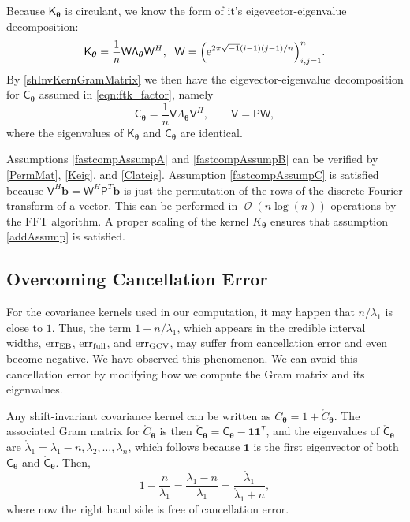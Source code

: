 \documentclass[twocolumn]{svjour3}          %
\DeclareMathOperator{\Order}{{\mathcal O}}
\newcommand{\bm}[1]{\boldsymbol{#1}}
\newcommand{\rC}{\mathring{C}}
\newcommand{\rlambda}{\mathring{\lambda}}
\newcommand{\vtheta}{{\bm{\theta}}}
\newcommand{\vb}{\bm{b}}
\newcommand{\vone}{\bm{1}}
\newcommand{\mC}{\mathsf{C}}
\newcommand{\mP}{\mathsf{P}}
\newcommand{\mK}{\mathsf{K}}
\newcommand{\rmC}{\mathring{\mathsf{C}}}
\newcommand{\mLambda}{\mathsf{\Lambda}}
\newcommand{\mV}{\mathsf{V}}
\newcommand{\mW}{\mathsf{W}}
\newcommand{\me}{\mathrm{e}}
\newcommand{\MLE}{\textup{EB}}
\newcommand{\err}{\textup{err}}
\begin{document}
Because $\mK_\vtheta$ is circulant, we know the form of it's eigevector-eigenvalue decomposition:
\begin{equation} \label{Keig}
    \mK_{\vtheta} = \frac 1n \mW \mLambda_\vtheta \mW^H, \; \ \mW =  \Bigl ( \me^{2 \pi \sqrt{-1} (i-1)(j-1)/n} \Bigr)_{i,j = 1}^n.
\end{equation}
By \eqref{shInvKernGramMatrix} we then have the eigevector-eigenvalue decomposition for $\mC_{\vtheta}$ assumed in \eqref{eqn:ftk_factor}, namely
\begin{equation} \label{Clateig}
    \mC_{\vtheta} = \frac 1n \mV \mLambda_\vtheta \mV^H , \qquad \mV = \mP \mW,
\end{equation}
where the eigenvalues of $\mK_{\vtheta}$ and $\mC_{\vtheta}$ are identical.

Assumptions \eqref{fastcompAssumpA} and \eqref{fastcompAssumpB} can be verified by \eqref{PermMat}, \eqref{Keig}, and \eqref{Clateig}.  Assumption \eqref{fastcompAssumpC} is satisfied because $\mV^H \vb = \mW^H \mP^T \vb$ is just the permutation of the rows of the discrete Fourier transform of a vector.  This can be performed in $\Order(n \log(n))$ operations by the FFT algorithm. A proper scaling of the kernel $K_\vtheta$ ensures that assumption \eqref{addAssump} is satisfied. 



\subsection{Overcoming Cancellation Error}
For the covariance kernels used in our computation, it may happen that $n/\lambda_1$ is close to $1$.  Thus, the term $1-n/\lambda_1$, which appears in the credible interval widths, $\err_{\MLE}$, $\err_{\textup{full}}$, and $\err_{\textup{GCV}}$, may suffer from cancellation error and even become negative.  We have observed this phenomenon.  We can avoid this cancellation error by modifying how we compute the Gram matrix and its eigenvalues.

Any shift-invariant covariance kernel can be written as $C_\vtheta = 1 + \rC_\vtheta$. The associated Gram matrix for $\rC_\vtheta$ is then $\rmC_\vtheta = \mC_\vtheta - \vone \vone^T$, and the eigenvalues of $\rmC_\vtheta$ are $\rlambda_1 = \lambda_1 - n, \lambda_2, \ldots, \lambda_n$, which follows because $\vone$ is the first eigenvector of both $\mC_\vtheta$ and $\rmC_\vtheta$. Then, 
\begin{equation*}
1 - \frac{n}{\lambda_1}  = \frac{\lambda_1 - n}{\lambda_1} = \frac{\rlambda_1}{\rlambda_1 +n},
\end{equation*}
where now the right hand side is free of cancellation error.
\end{document}

